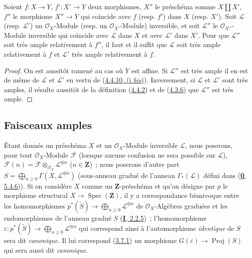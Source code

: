 \begin{proposition}[4.4.11]
\label{II.4.4.11-fr}
Soient $f:X\to Y$, $f':X'\to Y$ deux morphismes, $X''$ le préschéma somme
$X\amalg X'$, $f''$ le morphisme $X''\to Y$ qui coïncide avec $f$ \textup{(resp.
$f'$)} dans $X$ \textup{(resp. $X'$)}. Soit $\mathcal{L}$ \textup{(resp. $\mathcal{L}'$)} un
$\mathcal{O}_X$-Module \textup{(resp.} un $\mathcal{O}_{X'}$-Module\textup{)} inversible, et
soit $\mathcal{L}''$ le $\mathcal{O}_{X''}$-Module inversible qui coïncide
avec $\mathcal{L}$ dans $X$ et avec $\mathcal{L}'$ dans $X'$. Pour que
$\mathcal{L}''$ soit très ample relativement à $f''$, il faut et il suffit
que $\mathcal{L}$ soit très ample relativement à $f$ et $\mathcal{L}'$ très
ample relativement à $f$.
\end{proposition}

\begin{proof}
On est aussitôt ramené au cas où $Y$ est affine. Si $\mathcal{L}''$ est très
ample il en est de même de $\mathcal{L}$ et $\mathcal{L}'$ en vertu de
(\hyperref[II.4.4.10-fr]{4.4.10, (i \emph{bis})}). Inversement, si $\mathcal{L}$ et
$\mathcal{L}'$ sont très amples, il résulte aussitôt de la définition
(\hyperref[II.4.4.2-fr]{4.4.2}) et de
(\hyperref[II.4.3.6-fr]{4.3.6}) que $\mathcal{L}''$ est très ample.
\end{proof}

\subsection{Faisceaux amples}
\label{subsection:II.4.5-fr}

\begin{env}[4.5.1]
\label{II.4.5.1-fr}
Étant donnés un préschéma $X$ et un $\mathcal{O}_X$-Module inversible
$\mathcal{L}$, nous poserons, pour tout $\mathcal{O}_X$-Module $\mathcal{F}$
(lorsque aucune confusion ne sera possible sur $\mathcal{L}$),
$\mathcal{F}(n)=\mathcal{F}\otimes_{\mathcal{O}_X}\mathcal{L}^{\otimes n}$
($n\in\mathbf{Z}$)~; nous poserons d'autre part
$S=\bigoplus_{n\geq0}\Gamma(X,\mathcal{L}^{\otimes n})$
(sous-anneau gradué de l'anneau $\Gamma_*(\mathcal{L})$ défini dans
(\hyperref[0.5.4.6-fr]{\textbf{0}, 5.4.6})). Si on considère $X$ comme un
$\mathbf{Z}$-préschéma et qu'on désigne par $p$ le morphisme structural
$X\to\operatorname{Spec}(\mathbf{Z})$, il y a correspondance biunivoque
entre les homomorphismes
$p^*(\widetilde{S})\longrightarrow\bigoplus_{n\geq0}\mathcal{L}^{\otimes n}$
de $\mathcal{O}_X$-Algèbres graduées et les endomorphismes de l'anneau gradué
$S$ (\hyperref[I.2.2.5-fr]{\textbf{I}, 2.2.5})~; l'homomorphisme
$\varepsilon:p^*(\widetilde{S})\longrightarrow\bigoplus_{n\geq0}\mathcal{L}^{\otimes n}$
qui correspond ainsi à l'automorphisme \emph{identique} de $S$ sera dit \emph{canonique}.
Il lui correspond (\hyperref[II.3.7.1-fr]{3.7.1}) un morphisme
$G(\varepsilon)\to\operatorname{Proj}(S)$ qui sera aussi dit \emph{canonique}.
\end{env}

